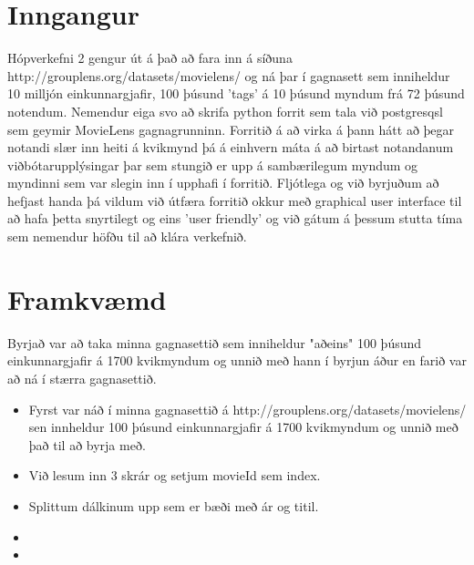 \documentclass[12pt, git, final]{rureport}
\begin{document}
\maketitle  %



\section{Inngangur} %

Hópverkefni 2 gengur út á það að fara inn á síðuna http://grouplens.org/datasets/movielens/ og ná þar í gagnasett sem inniheldur 10 milljón einkunnargjafir, 100 þúsund 'tags' á 10 þúsund myndum frá 72 þúsund notendum.
\newline
Nemendur eiga svo að skrifa python forrit sem tala við postgresqsl sem geymir MovieLens gagnagrunninn. Forritið á að virka á þann hátt að þegar notandi slær inn heiti á kvikmynd þá á einhvern máta á að birtast notandanum viðbótarupplýsingar þar sem stungið er upp á sambærilegum myndum og myndinni sem var slegin inn í upphafi í forritið.
\newline
\newline
Fljótlega og við byrjuðum að hefjast handa þá vildum við útfæra forritið okkur með graphical user interface til að hafa þetta snyrtilegt og eins 'user friendly' og við gátum á þessum stutta tíma sem nemendur höfðu til að klára verkefnið.
\section{Framkvæmd}
Byrjað var að taka minna gagnasettið sem inniheldur "aðeins" 100 þúsund einkunnargjafir á 1700 kvikmyndum og unnið með hann í byrjun áður en farið var að ná í stærra gagnasettið.
\begin{itemize} 
	\item Fyrst var náð í minna gagnasettið á http://grouplens.org/datasets/movielens/ sen innheldur 100 þúsund einkunnargjafir á 1700 kvikmyndum og unnið með það til að byrja með.
	\item Við lesum inn 3 skrár og setjum movieId sem index.
	\item Splittum dálkinum upp sem er bæði með ár og titil.
	\item 
	\item 
\end{itemize}
 
\end{document}
